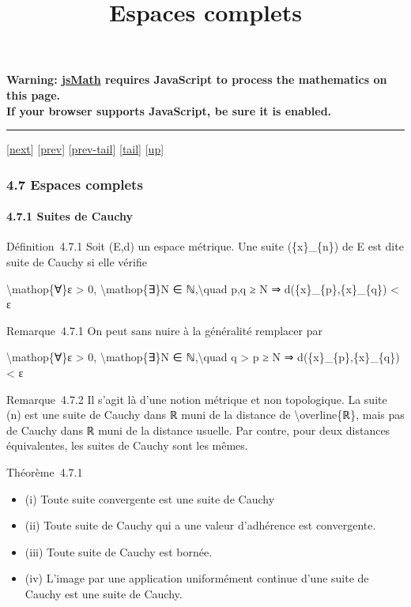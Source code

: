\documentclass[]{article}
\title{Espaces complets}
\author{}
\date{}
\begin{document}
\maketitle

\textbf{Warning: \href{http://www.math.union.edu/locate/jsMath}{jsMath}
requires JavaScript to process the mathematics on this page.\\ If your
browser supports JavaScript, be sure it is enabled.}

\begin{center}\rule{3in}{0.4pt}\end{center}

{[}\href{coursse25.html}{next}{]} {[}\href{coursse23.html}{prev}{]}
{[}\href{coursse23.html\#tailcoursse23.html}{prev-tail}{]}
{[}\hyperref[tailcoursse24.html]{tail}{]}
{[}\href{coursch5.html\#coursse24.html}{up}{]}

\subsubsection{4.7 Espaces complets}

\paragraph{4.7.1 Suites de Cauchy}

Définition~4.7.1 Soit (E,d) un espace métrique. Une suite (\{x\}\_\{n\})
de E est dite suite de Cauchy si elle vérifie

\textbackslash{}mathop\{∀\}ε \textgreater{} 0,
\textbackslash{}mathop\{∃\}N ∈ ℕ,\textbackslash{}quad p,q ≥ N ⇒
d(\{x\}\_\{p\},\{x\}\_\{q\}) \textless{} ε

Remarque~4.7.1 On peut sans nuire à la généralité remplacer par

\textbackslash{}mathop\{∀\}ε \textgreater{} 0,
\textbackslash{}mathop\{∃\}N ∈ ℕ,\textbackslash{}quad q \textgreater{} p
≥ N ⇒ d(\{x\}\_\{p\},\{x\}\_\{q\}) \textless{} ε

Remarque~4.7.2 Il s'agit là d'une notion métrique et non topologique. La
suite (n) est une suite de Cauchy dans ℝ muni de la distance de
\textbackslash{}overline\{ℝ\}, mais pas de Cauchy dans ℝ muni de la
distance usuelle. Par contre, pour deux distances équivalentes, les
suites de Cauchy sont les mêmes.

Théorème~4.7.1

\begin{itemize}
\itemsep1pt\parskip0pt
\item
  (i) Toute suite convergente est une suite de Cauchy
\item
  (ii) Toute suite de Cauchy qui a une valeur d'adhérence est
  convergente.
\item
  (iii) Toute suite de Cauchy est bornée.
\item
  (iv) L'image par une application uniformément continue d'une suite de
  Cauchy est une suite de Cauchy.
\end{itemize}
\end{document}
